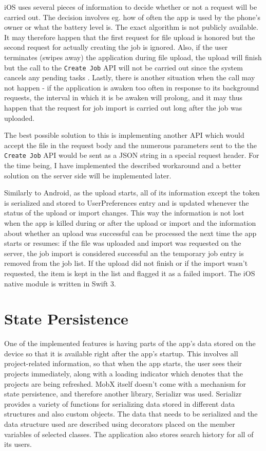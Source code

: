 iOS uses several pieces of information to decide whether or not a request will be carried out. The decision involves eg. how of often the app is used by the phone's owner or what the battery level is. The exact algorithm is not publicly available. It may therefore happen that the first request for file upload is honored but the second request for actually creating the job is ignored. Also, if the user terminates (swipes away) the application during file upload, the upload will finish but the call to the \texttt{Create Job} API will not be carried out since the system cancels any pending tasks \cite{ios:terminationOfPendingTasks}. Lastly, there is another situation when the call may not happen - if the application is awaken too often in response to its background requests, the interval in which it is be awaken will prolong, and it may thus happen that the request for job import is carried out long after the job was uploaded.

The best possible solution to this is implementing another API which would accept the file in the request body and the numerous parameters sent to the the \texttt{Create Job} API would be sent as a JSON string in a special request header. For the time being, I have implemented the described workaround and a better solution on the server side will be implemented later.


Similarly to Android, as the upload starts, all of its information except the token is serialized and stored to UserPreferences entry and is updated whenever the status of the upload or import changes. This way the information is not lost when the app is killed during or after the upload or import and the information about whether an upload was successful can be processed the next time the app starts or resumes: if the file was uploaded and import was requested on the server, the job import is considered successful an the  temporary job entry is removed from the job list. If the upload did not finish or if the import wasn't requested, the item is kept in the list and flagged it as a failed import. The iOS native module is written in Swift 3.


\section{State Persistence}

One of the implemented features is having parts of the app's data stored on the device so that it is available right after the app’s startup. This involves all project-related information, so that when the app starts, the user sees their projects immediately, along with a loading indicator which denotes that the projects are being refreshed. MobX itself doesn't come with a mechanism for state persistence, and therefore another library, Serializr was used. Serializr provides a variety of functions for serializing data stored in different data structures and also custom objects. The data that needs to be serialized and the data structure used are described using decorators placed on the member variables of selected classes. The application also stores search history for all of its users. 

